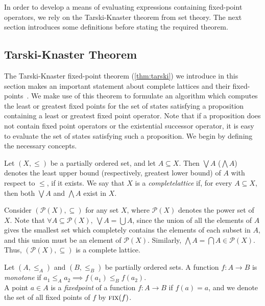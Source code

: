 In order to develop a means of evaluating expressions containing fixed-point operators, we rely on the Tarski-Knaster theorem from set theory. The next section introduces some definitions before stating the required theorem.






\subsection{Tarski-Knaster Theorem}

The Tarski-Knaster fixed-point theorem (\autoref{thm:tarski}) we introduce in this section makes an important statement about complete lattices and their fixed-points~\cite{Tarski1955}. We make use of this theorem to formulate an algorithm which computes the least or greatest fixed points for the set of states satisfying a \mucalc{} proposition containing a least or greatest fixed point operator. Note that if a proposition does not contain fixed point operators or the existential successor operator, it is easy to evaluate the set of states satisfying such a proposition. We begin by defining the necessary concepts.

\begin{defn}
    Let $(X, \leq)$ be a partially ordered set, and let $A \subseteq X$. Then $\bigvee A$ ($\bigwedge A$) denotes the least upper bound (respectively, greatest lower bound) of $A$ with respect to $\leq$, if it exists. We say that $X$ is a {\em complete\/lattice} if, for every $A \subseteq X$, then both $\bigvee A$ and $\bigwedge A$ exist in $X$.
\end{defn}

\begin{exmp}\label{ex_complat}
Consider $(\mathcal{P}(X), \subseteq)$ for any set $X$, where $\mathcal{P}(X)$ denotes the power set of $X$. Note that $\forall A \subseteq \mathcal{P}(X), \ \bigvee A = \bigcup A$, since the union of all the elements of $A$ gives the smallest set which completely contains the elements of each subset in $A$, and this union must be an element of $\mathcal{P}(X)$. Similarly, $\bigwedge A = \bigcap A \in \mathcal{P}(X)$. Thus, $(\mathcal{P}(X), \subseteq)$ is a complete lattice.
\end{exmp}

\begin{defn}
Let $(A, \leq_A)$ and $(B, \leq_B)$ be partially ordered sets. A function $f : A \to B$ is {\em monotone\/} if $a_1 \leq_A a_2 \implies f(a_1) \leq_B f(a_2)$.\\
A point $a \in A$ is a {\em fixed\/point} of a function $f: A \to B$ if $f(a) = a$, and we denote the set of all fixed points of $f$ by $\textsc{fix}(f)$.
\end{defn}

